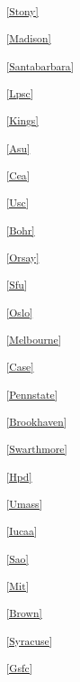 \begin{multicols}{2}
\noindent
\textsuperscript{\ref{Stony}}\Stonytext

\noindent
\textsuperscript{\ref{Madison}}\Madisontext

\noindent
\textsuperscript{\ref{Santabarbara}}\Santabarbaratext

\noindent
\textsuperscript{\ref{Lpsc}}\Lpsctext

\noindent
\textsuperscript{\ref{Kings}}\Kingstext

\noindent
\textsuperscript{\ref{Asu}}\Asutext

\noindent
\textsuperscript{\ref{Cea}}\Ceatext

\noindent
\textsuperscript{\ref{Usc}}\Usctext

\noindent
\textsuperscript{\ref{Bohr}}\Bohrtext

\noindent
\textsuperscript{\ref{Orsay}}\Orsaytext

\noindent
\textsuperscript{\ref{Sfu}}\Sfutext

\noindent
\textsuperscript{\ref{Oslo}}\Oslotext

\noindent
\textsuperscript{\ref{Melbourne}}\Melbournetext

\noindent
\textsuperscript{\ref{Case}}\Casetext

\noindent
\textsuperscript{\ref{Pennstate}}\Pennstatetext

\noindent
\textsuperscript{\ref{Brookhaven}}\Brookhaventext

\noindent
\textsuperscript{\ref{Swarthmore}}\Swarthmoretext

\noindent
\textsuperscript{\ref{Hpd}}\Hpdtext

\noindent
\textsuperscript{\ref{Umass}}\Umasstext

\noindent
\textsuperscript{\ref{Iucaa}}\Iucaatext

\noindent
\textsuperscript{\ref{Sao}}\Saotext

\noindent
\textsuperscript{\ref{Mit}}\Mittext

\noindent
\textsuperscript{\ref{Brown}}\Browntext

\noindent
\textsuperscript{\ref{Syracuse}}\Syracusetext

\noindent
\textsuperscript{\ref{Gsfc}}\Gsfctext

\normalsize

\end{multicols}

\parskip=8pt
